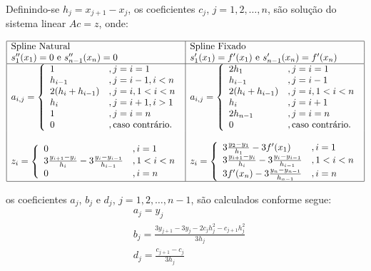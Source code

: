 \documentclass[main.tex]{subfiles}
\begin{document}
Definindo-se $h_j = x_{j+1} - x_j$, os coeficientes $c_j$, $j=1,2,\dotsc,n$, são solução do sistema linear $Ac = z$, onde:
\begin{small}
  \begin{equation*}
  \begin{array}{|l|l|}\hline
    \text{Spline Natural} & \text{Spline Fixado}\\
    s_1''(x_1) = 0 \text{ e } s_{n-1}''(x_n) = 0 & s_1'(x_1) = f'(x_1) \text{ e } s_{n-1}'(x_n) = f'(x_n)\\ \hline
    a_{i,j} = \left\{
      \begin{array}{ll}
        1 &, j=i=1\\
        h_{i-1} &, j = i-1, i<n\\
        2(h_i + h_{i-1}) &, j=i, 1<i<n\\
        h_i &, j=i+1, i>1\\
        1 &, j=i=n\\
        0 &, \text{caso contrário.}
      \end{array}
\right. &  a_{i,j} = \left\{
      \begin{array}{ll}
        2h_1 &, j=i=1\\
        h_{i-1} &, j = i-1\\
        2(h_i + h_{i-1}) &, j=i, 1<i<n\\
        h_i &, j=i+1\\
        2h_{n-1} &, j=i=n\\
        0 &, \text{caso contrário.}
      \end{array}
\right.\\
&\\
z_i = \left\{
  \begin{array}{ll}
    0 &, i=1\\
    3\frac{y_{i+1}-y_i}{h_i} - 3\frac{y_i-y_{i-1}}{h_{i-1}} &, 1<i<n\\
    0 &, i=n
  \end{array}
\right. & z_i = \left\{
  \begin{array}{ll}
    3\frac{y_2-y_1}{h_1} - 3f'(x_1) &, i=1\\
    3\frac{y_{i+1}-y_i}{h_i} - 3\frac{y_i-y_{i-1}}{h_{i-1}} &, 1<i<n\\
    3f'(x_n) - 3\frac{y_n - y_{n-1}}{h_{n-1}} &, i=n
  \end{array}
\right. \\ \hline
  \end{array}
\end{equation*}
\end{small}
os coeficientes $a_j$, $b_j$ e $d_j$, $j=1,2,\dotsc,n-1$, são calculados conforme segue:
\begin{align*}
  &a_j = y_j\\
  &b_j = \frac{3y_{j+1} - 3y_j - 2c_jh_j^2 - c_{j+1}h_j^2}{3h_j}\\
  &d_j = \frac{c_{j+1} - c_j}{3h_j}
\end{align*}
\end{document}
